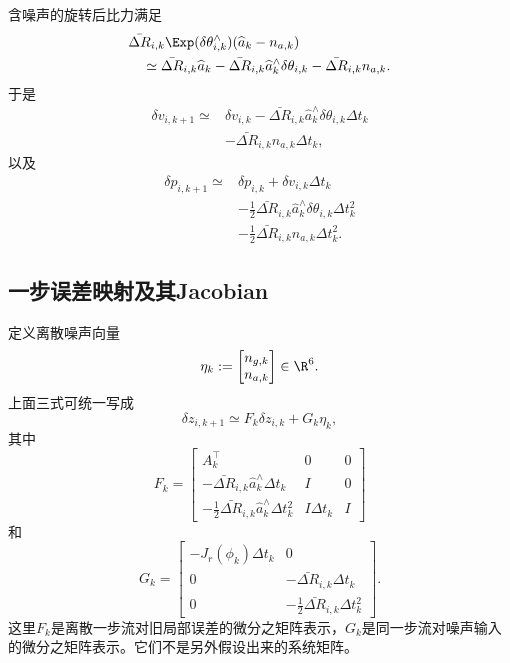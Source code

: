 含噪声的旋转后比力满足
\[
\begin{aligned}
    &\bar{\Delta R}_{i,k}
      \Exp(\delta\theta_{i,k}^\wedge)
      (\widehat a_k-n_{a,k})\\
    &\quad\simeq
    \bar{\Delta R}_{i,k}\widehat a_k
    -\bar{\Delta R}_{i,k}\widehat a_k^\wedge
     \delta\theta_{i,k}
    -\bar{\Delta R}_{i,k}n_{a,k}.
\end{aligned}
\]
于是
\[
\boxed{
\begin{aligned}
    \delta v_{i,k+1}
    \simeq{}&\delta v_{i,k}
    -\bar{\Delta R}_{i,k}\widehat a_k^\wedge
     \delta\theta_{i,k}\Delta t_k\\
    &-\bar{\Delta R}_{i,k}n_{a,k}\Delta t_k,
\end{aligned}
}
\]
以及
\[
\boxed{
\begin{aligned}
    \delta p_{i,k+1}
    \simeq{}&\delta p_{i,k}
    +\delta v_{i,k}\Delta t_k\\
    &-\frac12\bar{\Delta R}_{i,k}\widehat a_k^\wedge
     \delta\theta_{i,k}\Delta t_k^2\\
    &-\frac12\bar{\Delta R}_{i,k}n_{a,k}\Delta t_k^2.
\end{aligned}
}
\]

\subsection{一步误差映射及其Jacobian}

定义离散噪声向量
\[
    \eta_k
    :=
    \begin{bmatrix}
        n_{g,k}\\
        n_{a,k}
    \end{bmatrix}
    \in\R^6.
\]
上面三式可统一写成
\[
    \delta z_{i,k+1}
    \simeq
    F_k\delta z_{i,k}+G_k\eta_k,
\]
其中
\[
\boxed{
F_k=
\begin{bmatrix}
    A_k^\top & 0 & 0\\
    -\bar{\Delta R}_{i,k}\widehat a_k^\wedge\Delta t_k
        & I & 0\\
    -\frac12\bar{\Delta R}_{i,k}\widehat a_k^\wedge\Delta t_k^2
        & I\Delta t_k & I
\end{bmatrix}
}
\]
和
\[
\boxed{
G_k=
\begin{bmatrix}
    -J_r(\phi_k)\Delta t_k & 0\\
    0 & -\bar{\Delta R}_{i,k}\Delta t_k\\
    0 & -\frac12\bar{\Delta R}_{i,k}\Delta t_k^2
\end{bmatrix}.
}
\]
这里$F_k$是离散一步流对旧局部误差的微分之矩阵表示，$G_k$是同一步流对噪声输入的微分之矩阵表示。它们不是另外假设出来的系统矩阵。

